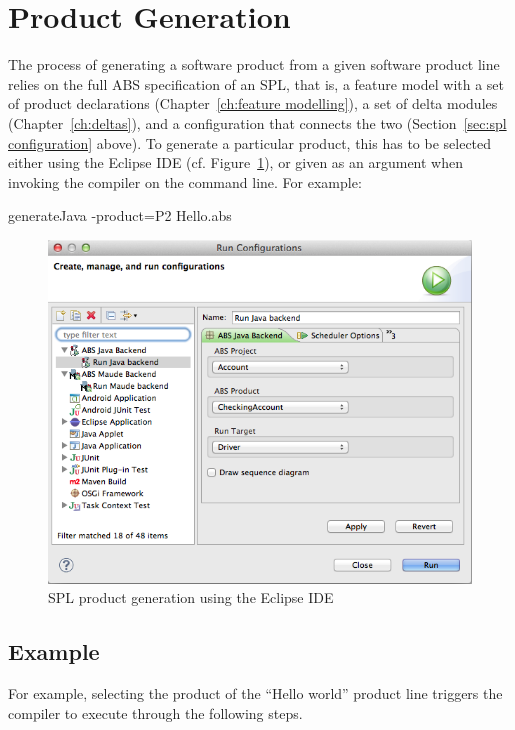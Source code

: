 \section{Product Generation}
\label{sec:product generation}

The process of generating a software product from a given software product line
relies on the full ABS specification of an SPL, that is, a feature model with a
set of product declarations (Chapter~\ref{ch:feature modelling}), a set of delta
modules (Chapter~\ref{ch:deltas}), and a configuration that connects the two
(Section~\ref{sec:spl configuration} above).
To generate a particular product, this has to be selected either using the
Eclipse IDE (cf. Figure~\ref{fig:eclipse product generation}), or given as an argument when invoking the compiler
on the command line. For example:

\begin{cmdline}
generateJava -product=P2 Hello.abs
\end{cmdline}

\begin{figure}[htp]
	\centering
	\includegraphics[width=.9\linewidth]{fig/eclipse-product-generation}
	\caption{SPL product generation using the Eclipse IDE}
 	\label{fig:eclipse product generation}
\end{figure}

\subsection{Example}

For example, selecting the product  of the ``Hello world'' product line
triggers the compiler to execute through the following steps.

